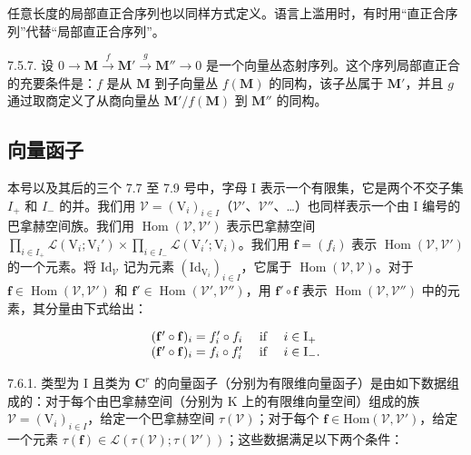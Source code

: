 任意长度的局部直正合序列也以同样方式定义。语言上滥用时，有时用“直正合序列”代替“局部直正合序列”。

7.5.7. 设 \(0 \to \mathbf{M} \xrightarrow{f} \mathbf{M}' \xrightarrow{g} \mathbf{M}'' \to 0\) 是一个向量丛态射序列。这个序列局部直正合的充要条件是：\(f\) 是从 \(\mathbf{M}\) 到子向量丛 \(f(\mathbf{M})\) 的同构，该子丛属于 \(\mathbf{M}'\)，并且 \(g\) 通过取商定义了从商向量丛 \(\mathbf{M}'/f(\mathbf{M})\) 到 \(\mathbf{M}''\) 的同构。

\subsection{向量函子}

本号以及其后的三个 7.7 至 7.9 号中，字母 I 表示一个有限集，它是两个不交子集 \(I_+\) 和 \(I_-\) 的并。我们用 \(\mathcal{V} = (\mathrm{V}_{i})_{i\in I}\)（\(\mathcal{V}'\)、\(\mathcal{V}''\)、\ldots）也同样表示一个由 I 编号的巴拿赫空间族。我们用 \(\operatorname{Hom}(\mathcal{V},\mathcal{V}')\) 表示巴拿赫空间 \(\prod_{i\in I_+}\mathcal{L}(\mathrm{V}_i;\mathrm{V}_i')\times \prod_{i\in I_-}\mathcal{L}(\mathrm{V}_i';\mathrm{V}_i)\)。我们用 \(\mathbf{f} = (f_i)\) 表示 \(\operatorname{Hom}(\mathcal{V},\mathcal{V}')\) 的一个元素。将 \(\mathrm{Id}_{\mathcal{V}}\) 记为元素 \((\mathrm{Id}_{\mathrm{V}_i})_{i\in I}\)，它属于 \(\operatorname{Hom}(\mathcal{V},\mathcal{V})\)。对于 \(\mathbf{f}\in \operatorname{Hom}(\mathcal{V},\mathcal{V}')\) 和 \(\mathbf{f}'\in \operatorname{Hom}(\mathcal{V}',\mathcal{V}'')\)，用 \(\mathbf{f}'\circ \mathbf{f}\) 表示 \(\operatorname{Hom}(\mathcal{V},\mathcal{V}'')\) 中的元素，其分量由下式给出：

\[
\begin{array}{l l} (\mathbf {f} ^ {\prime} \circ \mathbf {f}) _ {i} = f _ {i} ^ {\prime} \circ f _ {i} & \text { if } \quad i \in \mathrm{I} _ {+} \\ (\mathbf {f} ^ {\prime} \circ \mathbf {f}) _ {i} = f _ {i} \circ f _ {i} ^ {\prime} & \text { if } \quad i \in \mathrm{I} _ {-}. \end{array}
\]

7.6.1. 类型为 I 且类为 \(\mathbf{C}^r\) 的向量函子（分别为有限维向量函子）是由如下数据组成的：对于每个由巴拿赫空间（分别为 K 上的有限维向量空间）组成的族 \(\mathcal{V} = (\mathrm{V}_i)_{i\in I}\)，给定一个巴拿赫空间 \(\tau(\mathcal{V})\)；对于每个 \(\mathbf{f}\in\mathrm{Hom}(\mathcal{V},\mathcal{V}')\)，给定一个元素 \(\tau(\mathbf{f})\in\mathcal{L}(\tau(\mathcal{V});\tau(\mathcal{V}'))\)；这些数据满足以下两个条件：

